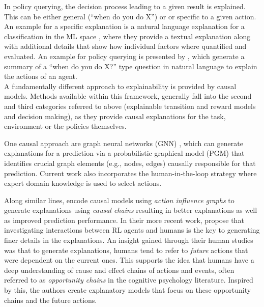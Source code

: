 \documentclass[twoside,11pt]{article}
\begin{document}
\begin{enumerate}

In policy querying, the decision process leading to a given result is explained. This can be either general (``when do you do X'') or or specific to a given action.
An example for a specific explanation is a natural language explanation for a classification in the ML space \citep{AlonsoEtAl:2018:xAINLBeerClassifier}, where they provide a textual explanation along with additional details that show how individual factors where quantified and evaluated. An example for policy querying is presented by \citet{HayesShah:2017:AutonomousPolicyExplanation}, which generate a summary of a ``when do you do X?'' type question in natural language to explain the actions of an agent. \\


A fundamentally different approach to explainability is provided by causal models. Methods available within this framework, generally fall into the second and third categories referred to above (explainable transition and reward models and decision making), as they provide causal explanations for the task, environment or the policies themselves. 

One causal approach are graph neural networks (GNN) \citep{Vu:2020:PGMExplainer}, which can generate explanations for a prediction via a probabilistic graphical model (PGM) that identifies crucial graph elements (e.g., nodes, edges) causally responsible for that prediction. Current work also incorporates the human-in-the-loop strategy \citep{HolzingerEtAl:2016:iMLExperiment, Holzinger:2019:HumanLoopAPIN} where expert domain knowledge is used to select actions. 

Along similar lines, \citet{MadumalEtAl:2020:CausalRLCFs} encode causal models using \emph{action influence graphs} to generate explanations using \emph{causal chains} resulting in better explanations as well as improved prediction performance. In their more recent work, \citet{Madumal:2020:DistalEF} propose that investigating interactions between RL agents and humans is the key to generating finer details in the explanations. An insight gained through their human studies was that to generate explanations, humans tend to refer to \emph{future} actions that were dependent on the current ones. This supports the idea that humans have a deep understanding of cause and effect chains of actions and events, often referred to as \emph{opportunity chains} in the cognitive psychology literature. Inspired by this, the authors create explanatory models that focus on these opportunity chains and the future actions.


\end{enumerate}
\end{document}
